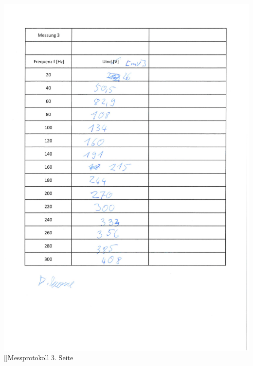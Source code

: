\begin{center}
    	\includegraphics[scale=0.65]{Protokoll/3.jpg}
        []{Messprotokoll 3. Seite}
    \end{center}
